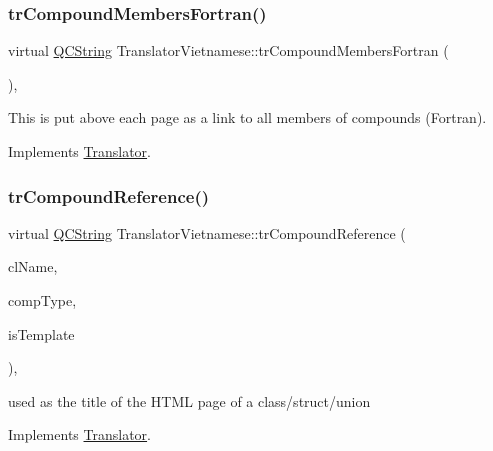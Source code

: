 \subsubsection{\texorpdfstring{trCompoundMembersFortran()}{trCompoundMembersFortran()}}
{\footnotesize\ttfamily virtual \mbox{\hyperlink{class_q_c_string}{Q\+C\+String}} Translator\+Vietnamese\+::tr\+Compound\+Members\+Fortran (\begin{DoxyParamCaption}{ }\end{DoxyParamCaption})\hspace{0.3cm}{\ttfamily [inline]}, {\ttfamily [virtual]}}

This is put above each page as a link to all members of compounds (Fortran). 

Implements \mbox{\hyperlink{class_translator}{Translator}}.

\mbox{\label{class_translator_vietnamese_a5c7fc89ece1e1200788b4a663fafb6a1}} 
\subsubsection{\texorpdfstring{trCompoundReference()}{trCompoundReference()}}
{\footnotesize\ttfamily virtual \mbox{\hyperlink{class_q_c_string}{Q\+C\+String}} Translator\+Vietnamese\+::tr\+Compound\+Reference (\begin{DoxyParamCaption}\item[{const char $\ast$}]{cl\+Name,  }\item[{\mbox{\hyperlink{class_class_def_ae70cf86d35fe954a94c566fbcfc87939}{Class\+Def\+::\+Compound\+Type}}}]{comp\+Type,  }\item[{bool}]{is\+Template }\end{DoxyParamCaption})\hspace{0.3cm}{\ttfamily [inline]}, {\ttfamily [virtual]}}

used as the title of the H\+T\+ML page of a class/struct/union 

Implements \mbox{\hyperlink{class_translator}{Translator}}.

\mbox{\label{class_translator_vietnamese_aa78671b55bbf591176d56610ab544c8f}} 
